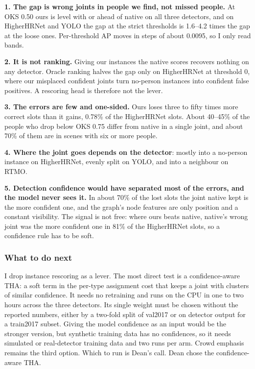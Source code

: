 \textbf{1. The gap is wrong joints in people we find, not missed people.} At OKS 0.50 ours is level with or ahead of native on all three detectors, and on HigherHRNet and YOLO the gap at the strict thresholds is 1.6--4.2 times the gap at the loose ones. Per-threshold AP moves in steps of about 0.0095, so I only read bands.

\textbf{2. It is not ranking.} Giving our instances the native scores recovers nothing on any detector. Oracle ranking halves the gap only on HigherHRNet at threshold 0, where our misplaced confident joints turn no-person instances into confident false positives. A rescoring head is therefore not the lever.

\textbf{3. The errors are few and one-sided.} Ours loses three to fifty times more correct slots than it gains, 0.78\% of the HigherHRNet slots. About 40--45\% of the people who drop below OKS 0.75 differ from native in a single joint, and about 70\% of them are in scenes with six or more people.

\textbf{4. Where the joint goes depends on the detector}: mostly into a no-person instance on HigherHRNet, evenly split on YOLO, and into a neighbour on RTMO.

\textbf{5. Detection confidence would have separated most of the errors, and the model never sees it.} In about 70\% of the lost slots the joint native kept is the more confident one, and the graph's node features are only position and a constant visibility. The signal is not free: where ours beats native, native's wrong joint was the more confident one in 81\% of the HigherHRNet slots, so a confidence rule has to be soft.

\subsubsection{What to do next}

I drop instance rescoring as a lever.
The most direct test is a confidence-aware THA: a soft term in the per-type assignment cost that keeps a joint with clusters of similar confidence. It needs no retraining and runs on the CPU in one to two hours across the three detectors.
Its single weight must be chosen without the reported numbers, either by a two-fold split of val2017 or on detector output for a train2017 subset.
Giving the model confidence as an input would be the stronger version, but synthetic training data has no confidences, so it needs simulated or real-detector training data and two runs per arm.
Crowd emphasis remains the third option.
Which to run is Dean's call.
Dean chose the confidence-aware THA.

